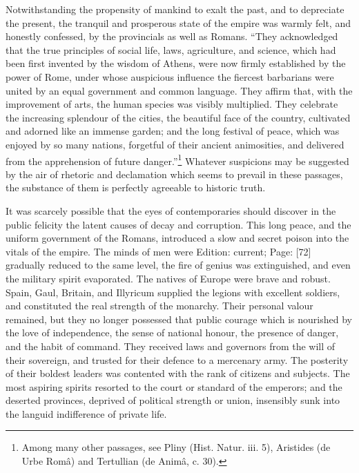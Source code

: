 Notwithstanding the propensity of mankind to exalt the past, and to depreciate the present, the tranquil and prosperous state of the empire was warmly felt, and honestly confessed, by the provincials as well as Romans. \texthebrew{“}They acknowledged that the true principles of social life, laws, agriculture, and science, which had been first invented by the wisdom of Athens, were now firmly established by the power of Rome, under whose auspicious influence the fiercest barbarians were united by an equal government and common language. They affirm that, with the improvement of arts, the human species was visibly multiplied. They celebrate the increasing splendour of the cities, the beautiful face of the country, cultivated and adorned like an immense garden; and the long festival of peace, which was enjoyed by so many nations, forgetful of their ancient animosities, and delivered from the apprehension of future danger.\texthebrew{}”\footnote{Among many other passages, see Pliny (Hist. Natur. iii. 5), Aristides (de Urbe Româ) and Tertullian (de Animâ, c. 30).} Whatever suspicions may be suggested by the air of rhetoric and declamation which seems to prevail in these passages, the substance of them is perfectly agreeable to historic truth.

It was scarcely possible that the eyes of contemporaries should discover in the public felicity the latent causes of decay and corruption. This long peace, and the uniform government of the Romans, introduced a slow and secret poison into the vitals of the empire. The minds of men were Edition: current; Page: [72] gradually reduced to the same level, the fire of genius was extinguished, and even the military spirit evaporated. The natives of Europe were brave and robust. Spain, Gaul, Britain, and Illyricum supplied the legions with excellent soldiers, and constituted the real strength of the monarchy. Their personal valour remained, but they no longer possessed that public courage which is nourished by the love of independence, the sense of national honour, the presence of danger, and the habit of command. They received laws and governors from the will of their sovereign, and trusted for their defence to a mercenary army. The posterity of their boldest leaders was contented with the rank of citizens and subjects. The most aspiring spirits resorted to the court or standard of the emperors; and the deserted provinces, deprived of political strength or union, insensibly sunk into the languid indifference of private life.

